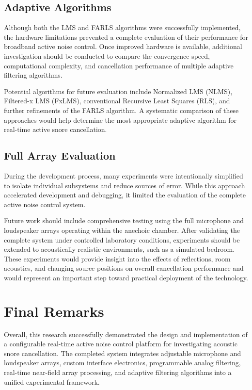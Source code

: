 \subsection{Adaptive Algorithms}

Although both the LMS and FARLS algorithms were successfully implemented, the hardware limitations prevented a complete evaluation of their performance for broadband active noise control. Once improved hardware is available, additional investigation should be conducted to compare the convergence speed, computational complexity, and cancellation performance of multiple adaptive filtering algorithms.

Potential algorithms for future evaluation include Normalized LMS (NLMS), Filtered-x LMS (FxLMS), conventional Recursive Least Squares (RLS), and further refinements of the FARLS algorithm. A systematic comparison of these approaches would help determine the most appropriate adaptive algorithm for real-time active snore cancellation.

\subsection{Full Array Evaluation}

During the development process, many experiments were intentionally simplified to isolate individual subsystems and reduce sources of error. While this approach accelerated development and debugging, it limited the evaluation of the complete active noise control system.

Future work should include comprehensive testing using the full microphone and loudspeaker arrays operating within the anechoic chamber. After validating the complete system under controlled laboratory conditions, experiments should be extended to acoustically realistic environments, such as a simulated bedroom. These experiments would provide insight into the effects of reflections, room acoustics, and changing source positions on overall cancellation performance and would represent an important step toward practical deployment of the technology.

\section{Final Remarks}

Overall, this research successfully demonstrated the design and implementation of a configurable real-time active noise control platform for investigating acoustic snore cancellation. The completed system integrates adjustable microphone and loudspeaker arrays, custom interface electronics, programmable analog filtering, real-time near-field array processing, and adaptive filtering algorithms into a unified experimental framework.

